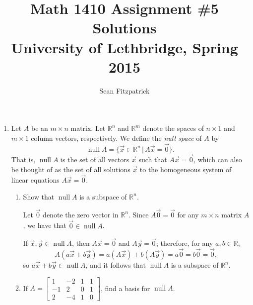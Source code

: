 \documentclass[letterpaper,12pt]{article}
\title{Math 1410 Assignment \#5 Solutions\\University of Lethbridge, Spring 2015}
\author{Sean Fitzpatrick}
\newcommand{\R}{\mathbb{R}}
\DeclareMathOperator{\nul}{null}
\begin{document}
 \maketitle


\begin{enumerate}
\item Let $A$ be an $m\times n$ matrix. Let $\R^n$ and $\R^m$ denote the spaces of $n\times 1$ and $m\times 1$ column vectors, respectively. We define the {\em null space} of $A$ by
\[
 \nul A = \{\vec{x}\in\R^n \,|\, A\vec{x}=\vec{0}\}.
\]
That is, $\nul A$ is the set of all vectors $\vec{x}$ such that $A\vec{x}=\vec{0}$, which can also be thought of as the set of all solutions $\vec{x}$ to the homogeneous system of linear equations $A\vec{x}=\vec{0}$. 
\begin{enumerate}
 \item Show that $\nul A$ is a subspace of $\R^n$.

\bigskip

Let $\vec{0}$ denote the zero vector in $\R^n$. Since $A\vec{0}=\vec{0}$ for any $m\times n$ matrix $A$, we have that $\vec{0}\in \nul A$.

If $\vec{x},\vec{y}\in \nul A$, then $A\vec{x}=\vec{0}$ and $A\vec{y}=\vec{0}$; therefore, for any $a,b\in \R$,
\[
 A(a\vec{x}+b\vec{y}) = a(A\vec{x})+b(A\vec{y}) = a\vec{0}=b\vec{0}=\vec{0},
\]
so $a\vec{x}+b\vec{y}\in\nul A$, and it follows that $\nul A$ is a subspace of $\R^n$.

\bigskip

 \item If $A = \begin{bmatrix}
                1&-2&1&1\\-1&2&0&1\\2&-4&1&0
               \end{bmatrix}$, find a basis for $\nul A$.


\end{enumerate}
\end{enumerate}
\end{document}
